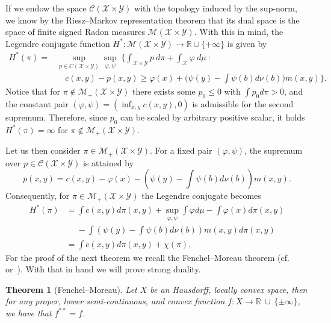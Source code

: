 \documentclass{article}
\newtheorem{theorem}{Theorem}[section]
\theoremstyle{definition}
\def\cC{\mathcal{C}}
\begin{document}
If we endow the space $\cC(\mathcal X \times \mathcal Y)$ with the topology induced by the sup-norm, we know by the Riesz–Markov representation theorem that its dual space is the space of finite signed Radon measures $\mathcal M (\mathcal X \times \mathcal Y)$. With this in mind, the Legendre conjugate function $H^* : \mathcal M (\mathcal X \times \mathcal Y) \to \mathbb R \cup \{+\infty\}$ is given by
\begin{align*}
    H^*(\pi) = &\sup_{p \in C(\mathcal X \times \mathcal Y)} \sup_{\varphi, \psi} \; \Big\{ \int_{\mathcal X \times \mathcal Y} p\ d\pi  + \int_{\mathcal{X}} \varphi \ d\mu \ : \\& \quad   c(x,y) - p(x,y) \geq \varphi(x) + \Big( \psi(y) - \int \psi(b) d\nu(b) \Big) m(x,y) \Big\}.	
\end{align*}
Notice that for $\pi \not \in \mathcal M_+(\mathcal X \times \mathcal Y)$ there exists some $p_0\leq 0$ with $\int p_0 d\pi > 0$, and the constant pair $(\varphi, \psi) = (\inf_{x,y} c(x,y), 0)$ is admissible for the second supremum. Therefore, since $p_0$ can be scaled by arbitrary positive scalar, it holds $H^*(\pi) = \infty$ for $\pi \not \in \mathcal M_+(\mathcal X \times \mathcal Y)$. 

Let us then consider $\pi \in \mathcal M_+(\mathcal X \times \mathcal Y)$. For a fixed pair $(\varphi, \psi)$, the supremum over $p \in \cC(\mathcal X \times \mathcal Y)$ is attained by
\[
p(x,y) = c(x,y) - \varphi(x) - \left(\psi(y) - \int \psi(b) d\nu(b)\right)m(x,y).
\]
Consequently, for $\pi \in \mathcal M_+(\mathcal X \times \mathcal Y)$ the Legendre conjugate becomes 
\begin{align*}
  H^*(\pi) &= \int c(x,y) d\pi(x,y)+ \sup_{\varphi,\psi} \int\varphi d\mu -\int \varphi(x)d\pi(x,y)\\ & \quad \;  - \int \left(\psi(y) - \int \psi(b) d\nu(b)\right)m(x,y) d\pi(x,y) \\
  &= \int c(x,y) d\pi(x,y) + \chi(\pi).
\end{align*}
For the proof of the next theorem we recall the Fenchel–Moreau theorem (cf.~\cite[Theorem 12.2]{rockafellar1970convex} or~\cite[Theorem 3.2.2]{CorreaRafael2023FoCA}). With that in hand we will prove strong duality.

\begin{theorem}[Fenchel–Moreau] 
Let $X$ be an  Hausdorff, locally convex space, then for any proper, lower semi-continuous, and convex function $f : X \to \mathbb R \ \cup \ \{\pm \infty\}$, we have that $f^{**}=f$.
\end{theorem} 
\end{document}
